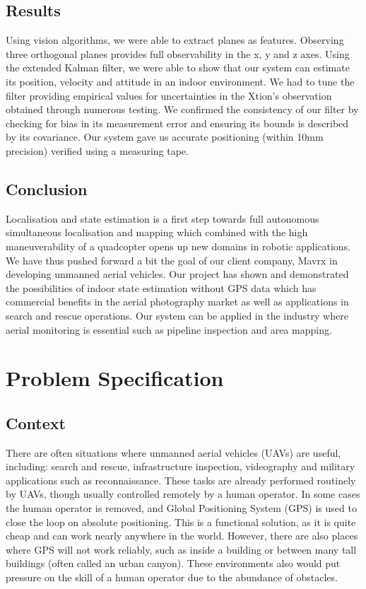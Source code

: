 \documentclass[]{article}
\begin{document}
{\subsection{Results}
Using vision algorithms, we were able to extract planes as features. Observing three orthogonal planes provides full observability in the x, y and z axes. Using the extended Kalman filter, we were able to show that our system can estimate its position, velocity and attitude in an indoor environment. We had to tune the filter providing empirical values for uncertainties in the Xtion's observation obtained through numerous testing. We confirmed the consistency of our filter by checking for bias in its measurement error and ensuring its bounds is described by its covariance. Our system gave us accurate positioning (within 10mm precision) verified using a measuring tape. 

\subsection{Conclusion}
Localisation and state estimation is a first step towards full autonomous simultaneous localisation and mapping which combined with the high maneuverability of a quadcopter opens up new domains in robotic applications. We have thus pushed forward a bit the goal of our client company, Mavrx in developing unmanned aerial vehicles. Our project has shown and demonstrated the possibilities of indoor state estimation without GPS data which has commercial benefits in the aerial photography market as well as applications in search and rescue operations. Our system can be applied in the industry where aerial monitoring is essential such as pipeline inspection and area mapping.  


\clearpage


\section{Problem Specification}
\label{sec:problem_specification}


\subsection{Context} %
\label{sub:context}

There are often situations where unmanned aerial vehicles (UAVs) are useful, including: search and rescue, infrastructure inspection, videography and military applications such as reconnaissance. These tasks are already performed routinely by UAVs, though usually controlled remotely by a human operator. In some cases the human operator is removed, and Global Positioning System (GPS) is used to close the loop on absolute positioning. This is a functional solution, as it is quite cheap and can work nearly anywhere in the world. However, there are also places where GPS will not work reliably, such as inside a building or between many tall buildings (often called an urban canyon). These environments also would put pressure on the skill of a human operator due to the abundance of obstacles.

}
\end{document}
